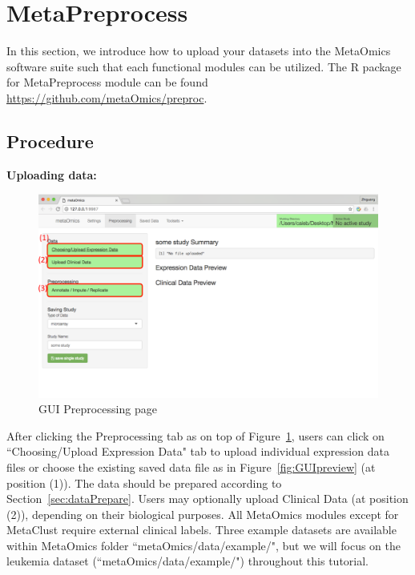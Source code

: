 

\section{MetaPreprocess}

In this section, we introduce how to upload your datasets into the MetaOmics software suite such that each functional modules can be utilized.
The R package for MetaPreprocess module can be found \url{https://github.com/metaOmics/preproc}.

\subsection{Procedure}
\label{sec:procedure}

\begin{steps}
\item \textbf{Uploading data:}

\begin{figure}[!htbp]
\begin{center}
\includegraphics[scale=0.7]{./figure/preprocessing/GUIpreprocessing}
\caption{GUI Preprocessing page}
\label{fig:GUIpreprocessing}
\end{center}
\end{figure}

After clicking the Preprocessing tab as on top of Figure~\ref{fig:GUIpreprocessing},
users can click on ``Choosing/Upload Expression Data" tab to upload individual expression data files or choose the existing saved data file as in Figure~\ref{fig:GUIpreview} (at position {\color{red} (1)}).
The data should be prepared according to Section~\ref{sec:dataPrepare}.
Users may optionally upload Clinical Data (at position {\color{red} (2)}), depending on their biological purposes.
All MetaOmics modules except for MetaClust  require external clinical labels.
Three example datasets are available within MetaOmics folder ``metaOmics/data/example/",
but we will focus on the leukemia dataset (``metaOmics/data/example/") throughout this tutorial.


\end{steps}
